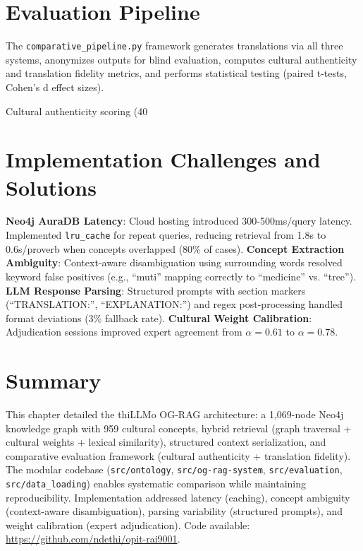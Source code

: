\section{Evaluation Pipeline}
\label{sec:eval_pipeline}

The \texttt{comparative\_pipeline.py} framework generates translations via all three systems, anonymizes outputs for blind evaluation, computes cultural authenticity and translation fidelity metrics, and performs statistical testing (paired t-tests, Cohen's d effect sizes).

Cultural authenticity scoring (40%

\section{Implementation Challenges and Solutions}
\label{sec:implementation_challenges}

\textbf{Neo4j AuraDB Latency}: Cloud hosting introduced 300-500ms/query latency. Implemented \texttt{lru\_cache} for repeat queries, reducing retrieval from 1.8s to 0.6s/proverb when concepts overlapped (80\% of cases). \textbf{Concept Extraction Ambiguity}: Context-aware disambiguation using surrounding words resolved keyword false positives (e.g., ``muti'' mapping correctly to ``medicine'' vs. ``tree''). \textbf{LLM Response Parsing}: Structured prompts with section markers (``TRANSLATION:'', ``EXPLANATION:'') and regex post-processing handled format deviations (3\% fallback rate). \textbf{Cultural Weight Calibration}: Adjudication sessions improved expert agreement from $\alpha = 0.61$ to $\alpha = 0.78$.

\section{Summary}
\label{sec:design_summary}

This chapter detailed the thiLLMo OG-RAG architecture: a 1,069-node Neo4j knowledge graph with 959 cultural concepts, hybrid retrieval (graph traversal + cultural weights + lexical similarity), structured context serialization, and comparative evaluation framework (cultural authenticity + translation fidelity). The modular codebase (\texttt{src/ontology}, \texttt{src/og-rag-system}, \texttt{src/evaluation}, \texttt{src/data\_loading}) enables systematic comparison while maintaining reproducibility. Implementation addressed latency (caching), concept ambiguity (context-aware disambiguation), parsing variability (structured prompts), and weight calibration (expert adjudication). Code available: \url{https://github.com/ndethi/opit-rai9001}.
